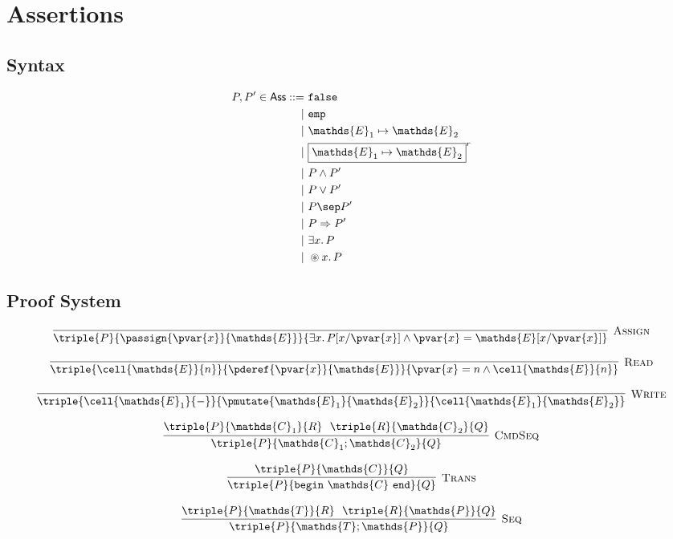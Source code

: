 \section{Assertions}

\subsection{Syntax}

\begin{align*}
P, P' \in \mathsf{Ass} ::=&
\ \mathtt{false} \\
|&\ \mathtt{emp} \\
|&\ \mathds{E}_1 \mapsto \mathds{E}_2 \\
|&\ \boxed{\mathds{E}_1 \mapsto \mathds{E}_2}^r \\
|&\ P \land P' \\
|&\ P \lor P' \\
|&\ P \sep P' \\
|&\ P \Rightarrow P' \\
|&\ \exists x \ldotp P \\
|&\ \circledast x \ldotp P
\end{align*}

\subsection{Proof System}

\[
\infer[\textsc{Assign}]
{
	\triple
	{P}
	{\passign{\pvar{x}}{\mathds{E}}}
	{\exists x\ldotp P[x/\pvar{x}] \land \pvar{x} = \mathds{E}[x/\pvar{x}]}
}
{}
\]

\[
\infer[\textsc{Read}]
{
	\triple
	{\cell{\mathds{E}}{n}}
	{\pderef{\pvar{x}}{\mathds{E}}}
	{\pvar{x} = n \land \cell{\mathds{E}}{n}}
}
{}
\]

\[
\infer[\textsc{Write}]
{
	\triple
	{\cell{\mathds{E}_1}{-}}
	{\pmutate{\mathds{E}_1}{\mathds{E}_2}}
	{\cell{\mathds{E}_1}{\mathds{E}_2}}
}
{}
\]

\[
\infer[\textsc{CmdSeq}]
{
	\triple
	{P}
	{\mathds{C}_1; \mathds{C}_2}
	{Q}
}
{
	\triple
	{P}
	{\mathds{C}_1}
	{R}\ \
	\triple
	{R}
	{\mathds{C}_2}
	{Q}
}
\]

\[
\infer[\textsc{Trans}]
{
	\triple
	{P}
	{\mathtt{begin}\ \mathds{C}\ \mathtt{end}}
	{Q}
}
{
	\triple
	{P}
	{\mathds{C}}
	{Q}
}
\]

\[
\infer[\textsc{Seq}]
{
	\triple
	{P}
	{\mathds{T}; \mathds{P}}
	{Q}
}
{
	\triple
	{P}
	{\mathds{T}}
	{R}\ \
	\triple
	{R}
	{\mathds{P}}
	{Q}
}
\]

